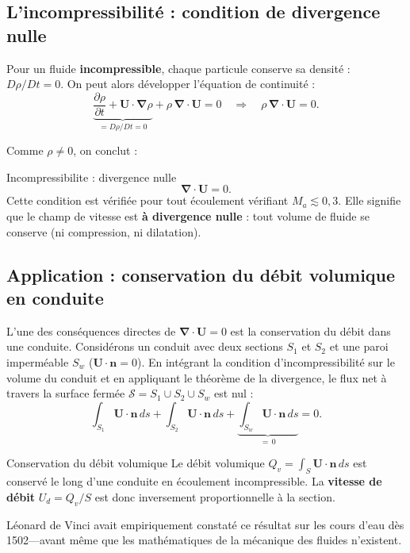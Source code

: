 \documentclass[11pt,a4paper]{report}
\newcommand{\pd}[2]{\dfrac{\partial #1}{\partial #2}}
\begin{document}
\subsection{L'incompressibilité : condition de divergence nulle}

Pour un fluide \textbf{incompressible}, chaque particule conserve sa densité :
$D\rho/Dt = 0$. On peut alors développer l'équation de continuité :
\[
    \underbrace{\pd{\rho}{t} + \bm{U}\cdot\boldsymbol{\nabla}\rho}_{= D\rho/Dt = 0}
    + \rho\,\boldsymbol{\nabla}\cdot\bm{U} = 0
    \quad\Longrightarrow\quad
    \rho\,\boldsymbol{\nabla}\cdot\bm{U} = 0.
\]

Comme $\rho \neq 0$, on conclut :

\begin{importantbox}{Incompressibilite : divergence nulle}
\[
    \boldsymbol{\nabla}\cdot\bm{U} = 0.
\]
Cette condition est vérifiée pour tout écoulement vérifiant $M_a \lesssim 0{,}3$.
Elle signifie que le champ de vitesse est \textbf{à divergence nulle} : tout volume
de fluide se conserve (ni compression, ni dilatation).
\end{importantbox}

\subsection{Application : conservation du débit volumique en conduite}

L'une des conséquences directes de $\boldsymbol{\nabla}\cdot\bm{U} = 0$ est la
conservation du débit dans une conduite. Considérons un conduit avec deux sections
$S_1$ et $S_2$ et une paroi imperméable $S_w$ ($\bm{U}\cdot\bm{n}=0$). En intégrant
la condition d'incompressibilité sur le volume du conduit et en appliquant le théorème
de la divergence, le flux net à travers la surface fermée $\mathcal{S} = S_1 \cup S_2
\cup S_w$ est nul :
\[
    \int_{S_1} \bm{U}\cdot\bm{n}\,ds + \int_{S_2} \bm{U}\cdot\bm{n}\,ds
    + \underbrace{\int_{S_w} \bm{U}\cdot\bm{n}\,ds}_{=\,0} = 0.
\]

\begin{importantbox}{Conservation du débit volumique}
Le débit volumique $Q_v = \int_S \bm{U}\cdot\bm{n}\,ds$ est conservé le long d'une
conduite en écoulement incompressible. La \textbf{vitesse de débit}
$U_d = Q_v/S$ est donc inversement proportionnelle à la section.
\end{importantbox}

Léonard de Vinci avait empiriquement constaté ce résultat sur les cours d'eau dès
1502---avant même que les mathématiques de la mécanique des fluides n'existent.
\end{document}
